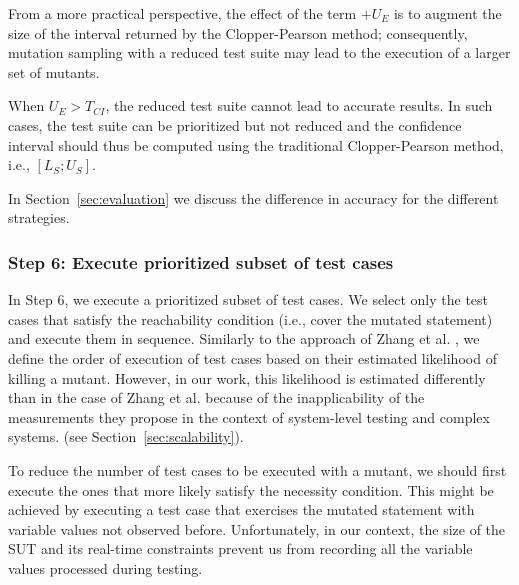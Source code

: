  {From a more practical perspective, the effect of the term $+\mathit{U}_{E}$ is to augment the size of the interval returned by the Clopper-Pearson method; consequently, mutation sampling with a reduced test suite may lead to the execution of a larger set of mutants.}

 {When $\mathit{U}_{E}>T_{\mathit{CI}}$, the reduced test suite cannot lead to accurate results. In such cases, the test suite can be prioritized but not reduced and the confidence interval should thus be computed using the traditional Clopper-Pearson method, i.e., $[\mathit{L}_{S};\mathit{U}_{S}]$.}

 {In Section~\ref{sec:evaluation} we discuss the difference in accuracy for the different strategies.}

\ENDCHANGEDNOV

\subsubsection{Step 6: Execute prioritized subset of test cases}
\label{sec:step:prioritize}

In Step 6, we execute a prioritized subset of test cases. 
We select only the test cases that satisfy 
the reachability condition (i.e., cover the mutated statement) and  execute them in sequence.
Similarly to the approach of Zhang et al. \cite{zhang2013faster}, we define the order of execution of test cases based on their estimated likelihood of killing a mutant.
 {However, in our work, this likelihood is estimated differently than in the case of Zhang et al. because of the inapplicability of the measurements they propose in the context of system-level testing and complex systems. 
(see Section~\ref{sec:scalability}).}



To reduce the number of test cases to be executed with a mutant, 
we should first execute the ones that more likely satisfy the necessity condition. 
This might be achieved by executing a test case that exercises the mutated statement with variable values not observed before. 
Unfortunately, in our context, the size of the SUT and its real-time constraints prevent us from recording all the variable values processed during testing. 

